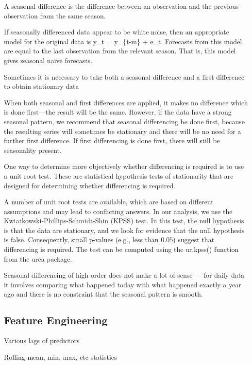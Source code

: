 \documentclass[]{book}
\begin{document}
A seasonal difference is the difference between an observation and the previous observation from the same season.

If seasonally differenced data appear to be white noise, then an appropriate model for the original data is y\_t = y\_\{t-m\} + e\_t. Forecasts from this model are equal to the last observation from the relevant season. That is, this model gives seasonal naïve forecasts.

Sometimes it is necessary to take both a seasonal difference and a first difference to obtain stationary data

When both seasonal and first differences are applied, it makes no difference which is done first---the result will be the same. However, if the data have a strong seasonal pattern, we recommend that seasonal differencing be done first, because the resulting series will sometimes be stationary and there will be no need for a further first difference. If first differencing is done first, there will still be seasonality present.

One way to determine more objectively whether differencing is required is to use a unit root test. These are statistical hypothesis tests of stationarity that are designed for determining whether differencing is required.

A number of unit root tests are available, which are based on different assumptions and may lead to conflicting answers. In our analysis, we use the Kwiatkowski-Phillips-Schmidt-Shin (KPSS) test. In this test, the null hypothesis is that the data are stationary, and we look for evidence that the null hypothesis is false. Consequently, small p-values (e.g., less than 0.05) suggest that differencing is required. The test can be computed using the ur.kpss() function from the urca package.

Seasonal differencing of high order does not make a lot of sense --- for daily data it involves comparing what happened today with what happened exactly a year ago and there is no constraint that the seasonal pattern is smooth.

\hypertarget{feature-engineering-1}{%
\subsection{Feature Engineering}\label{feature-engineering-1}}

Various lags of predictors

Rolling mean, min, max, etc statistics
\end{document}
